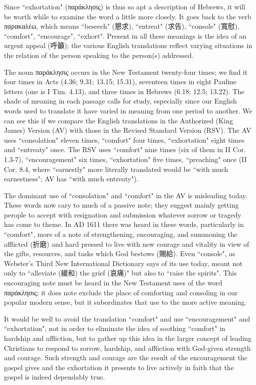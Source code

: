 Since ``exhortation" (παράκλησις) is thus so apt a description of Hebrews, it
will be worth while to examine the word a little more closely.
It goes back to the verb παρακαλέω, which means ``beseech" (懇求),
``entreat" (求告), ``console" (寬慰), ``comfort", ``encourage", ``exhort".
Present in all these meanings is the idea of an urgent appeal (呼籲); the
various English translations reflect varying situations in the relation of the
person speaking to the person(s) addressed.

The noun παράκλησις occurs in the New Testament twenty-four times; we find it
four times in Acts (4.36; 9.31; 13.15; 15.31), seventeen times in eight Pauline
letters (one is I Tim. 4.13), and three times in Hebrews (6.18; 12.5; 13.22).
The shade of meaning in each passage calls for study, especially since our
English words used to translate it have varied in meaning from one period to
another.
We can see this if we compare the English translations in the Authorized (King
James) Version (AV) with those in the Revised Standard Version (RSV).
The AV uses ``consolation" eleven times, ``comfort" four times, ``exhortation"
eight times and ``entreaty" once.
The RSV uses ``comfort" nine times (six of them in II Cor. 1.3-7),
``encouragement" six times, ``exhortation" five times, ``preaching" once
(II Cor. 8.4, where ``earnestly" more literally translated would be ``with much
earnestness"; AV has ``with much entreaty").

The dominant use of ``consolation" and ``comfort" in the AV is misleading today.
These words now cary to much of a passive note; they suggest mainly getting
perople to accept with resignation and submission whatever sorrow or tragedy
has come to theme.
In AD 1611 there was heard in these words, particularly in ``comfort", more of
a note of strengthening, encouraging, and summoning the afflicted (折磨) and
hard pressed to live with new courage and vitality in view of the gifts,
resources, and tasks which God bestows (賜給).
Even ``console", as Webster's Third New International Dictionary says of its
use today, meant not only to ``alleviate (緩和) the grief (哀痛)" but also to
``raise the spirits".
This encouraging note must be heard in the New Testament uses of the word
παράκλησις; it does note exclude the place of comforting and consoling in our
popular modern sense, but it subordinates that use to the more active meaning.

It would be well to avoid the translation ``comfort" and use ``encouragement"
and ``exhortation", not in order to eliminate the idea of soothing ``comfort"
in hardship and affliction, but to gather up this idea in the larger concept of
leading Christians to respond to sorrow, hardship, and affliction with
God-given strength and courage.
Such strength and courage are the result of the encouragement the gospel gives
and the exhortation it presents to live actively in faith that the gospel is
indeed dependably true.

